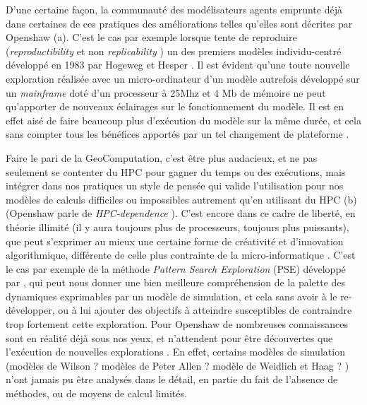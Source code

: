 D'une certaine façon, la communauté des modélisateurs agents emprunte déjà dans certaines de ces pratiques des améliorations telles qu'elles sont décrites par Openshaw (a). C'est le cas par exemple lorsque \autocite{Brearcliffe2014} tente de reproduire (\textit{reproductibility} et non \textit{replicability} ) un des premiers modèles individu-centré développé en 1983 par Hogeweg et Hesper \autocite{Hogeweg1983}. Il est évident qu'une toute nouvelle exploration réalisée avec un micro-ordinateur d'un modèle autrefois développé sur un \textit{mainframe} doté d'un processeur à 25Mhz et 4 Mb de mémoire ne peut qu'apporter de nouveaux éclairages sur le fonctionnement du modèle. Il est en effet aisé de faire beaucoup plus d'exécution du modèle sur la même durée, et cela sans compter tous les bénéfices apportés par un tel changement de plateforme \autocite{Wilensky2007a}.

Faire le pari de la GeoComputation, c'est être plus audacieux, et ne pas seulement se contenter du HPC pour gagner du temps ou des exécutions, mais intégrer dans nos pratiques un style de pensée qui valide l'utilisation pour nos modèles de calculs difficiles ou impossibles autrement qu'en utilisant du HPC (b)(Openshaw parle de \textit{HPC-dependence} ). C'est encore dans ce cadre de liberté, en théorie illimité (il y aura toujours plus de processeurs, toujours plus puissants), que peut s'exprimer au mieux une certaine forme de créativité et d'innovation algorithmique, différente de celle plus contrainte de la micro-informatique \autocite[26-28]{Openshaw2000}. C'est le cas par exemple de la méthode \textit{Pattern Search Exploration} (PSE) développé par \textcite{Cherel2015}, qui peut nous donner une bien meilleure compréhension de la palette des dynamiques exprimables par un modèle de simulation, et cela sans avoir à le re-développer, ou à lui ajouter des objectifs à atteindre susceptibles de contraindre trop fortement cette exploration. Pour Openshaw de nombreuses connaissances sont en réalité déjà sous nos yeux, et n'attendent pour être découvertes que l'exécution de nouvelles explorations . En effet, certains modèles de simulation (modèles de Wilson ? modèles de Peter Allen ? modèle de Weidlich et Haag ? ) n'ont jamais pu être analysés dans le détail, en partie du fait de l'absence de méthodes, ou de moyens de calcul limités.

